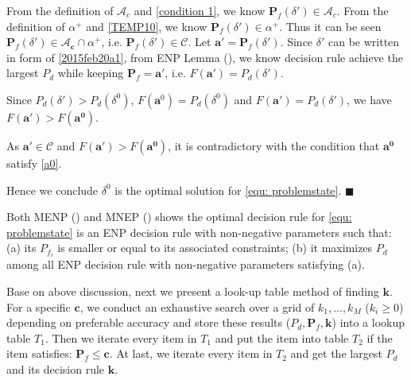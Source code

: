 From the definition of $\mathcal{A}_c$ and \eqref{condition 1}, we know $\mathbf{P}_f(\delta') \in \mathcal{A}_c$. 
From the definition of $\alpha^+$ and \eqref{TEMP10}, we know $\mathbf{P}_f(\delta') \in \alpha^+$. 
Thus it can be seen $\mathbf{P}_f(\delta') \in \mathcal{A}_\mathbf{c} \cap \alpha^+$, i.e. $\mathbf{P}_f(\delta') \in \mathcal{C}$.  
Let $\mathbf{a}' = \mathbf{P}_f(\delta')$. 
Since $\delta'$ can be written in form of \eqref{2015feb20a1}, from ENP Lemma (), we know decision rule achieve the largest $P_d$ while keeping $\mathbf{P}_f = \mathbf{a}'$, i.e.  
$F(\mathbf{a}') = P_d(\delta')$. 

Since $P_d(\delta') > P_d(\delta^0)$, $F(\mathbf{a}^0) = P_d(\delta^0)$ and  $F(\mathbf{a}') = P_d(\delta')$, we have $F(\mathbf{a'}) > F(\mathbf{a^0})$. 

As $\mathbf{a}' \in \mathcal{C}$ and $F(\mathbf{a'}) > F(\mathbf{a^0})$, it is contradictory with the condition that $\mathbf{a^0}$ satisfy \eqref{a0}.

Hence we conclude $\delta^0$ is the optimal solution for \eqref{equ: problemstate}. $\blacksquare$

Both MENP () and MNEP () shows the optimal decision rule for \eqref{equ: problemstate} is an ENP decision rule  with non-negative parameters such that: (a) its $P_{f_i}$ is smaller or equal to its associated constraints; (b) it maximizes $P_d$ among all ENP decision rule with non-negative parameters satisfying (a).

Base on above discussion, 
next we present a look-up table method of finding $\mathbf{k}$. For a specific $\mathbf{c}$, we conduct an exhaustive search over a grid of $k_1, ..., k_M$ ($k_i \geq 0$) depending on preferable accuracy and store these results ($P_d, \mathbf{P}_f, \mathbf{k}$) into a lookup table $T_1$. 
Then we iterate every item in $T_1$ and put the item into table $T_2$ if the item satisfies:  $\mathbf{P}_f \leq \mathbf{c}$.
At last, we iterate every item in $T_2$ and get the largest $P_d$ and its decision rule $\mathbf{k}$.

